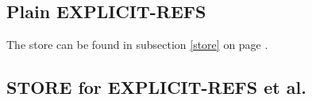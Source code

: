 \documentclass[../codeprint.tex]{subfiles}
\begin{document}
\subsection{Plain EXPLICIT-REFS}
\label{lang:EXPLICIT-REFS}
The store can be found in subsection \autoref{store} on page \pageref{store}.



\subsection{STORE for EXPLICIT-REFS et al.}

\end{document}
